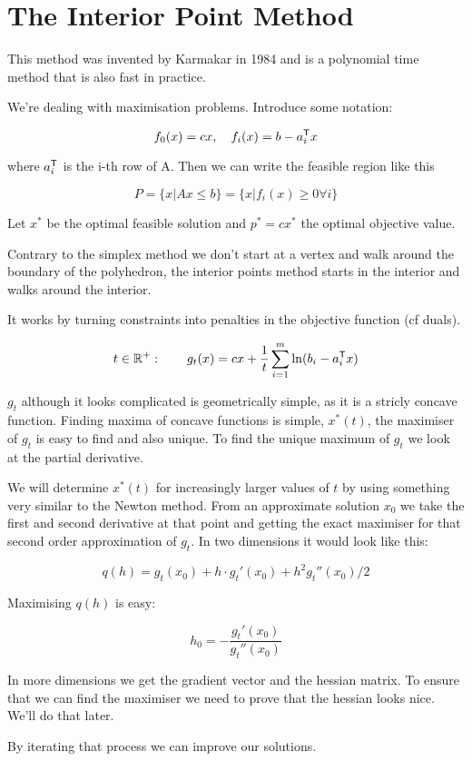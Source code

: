 \section{The Interior Point Method}

This method was invented by Karmakar in 1984 and is a polynomial time method that is also fast in practice.

We're dealing with maximisation problems. Introduce some notation:

\[f_0(x) = cx,\quad f_i(x)=b-{a}^\text{\upshape \sffamily T}_i x\]

where ${a}^\text{\upshape \sffamily T}_i$ is the i-th row of A. Then we can write the feasible region like this

\[P=\{x|Ax\leq b\}=\{x|f_i(x)\geq 0 \forall i\}\]

Let $x^*$ be the optimal feasible solution and $p^*=cx^*$ the optimal objective value. 

Contrary to the simplex method we don't start at a vertex and walk around the boundary of the polyhedron, the interior points method starts in the interior and walks around the interior.

It works by turning constraints into penalties in the objective function (cf duals). 

\[t\in \mathbb{R}^+:\qquad g_t(x)=cx+\frac 1t \sum_{i=1}^m\ln (b_i-{a}^\text{\upshape \sffamily T}_i x)\]

$g_t$ although it looks complicated is geometrically simple, as it is a stricly concave function. Finding maxima of concave functions is simple, $x^*(t)$, the maximiser of $g_t$ is easy to find and also unique. To find the unique maximum of $g_t$ we look at the partial derivative.

We will determine $x^*(t)$ for increasingly larger values of $t$ by using something very similar to the Newton method. From an approximate solution $x_0$ we take the first and second derivative at that point and getting the exact maximiser for that second order approximation of $g_t$. In two dimensions it would look like this:

\[q(h) = g_t(x_0) + h \cdot g_t'(x_0) + h^2 g_t''(x_0)/2\]

Maximising $q(h)$ is easy:

\[h_0 = - \frac{g_t'(x_0)}{g_t''(x_0)} \]

In more dimensions we get the gradient vector and the hessian matrix. To ensure that we can find the maximiser we need to prove that the hessian looks nice. We'll do that later.

By iterating that process we can improve our solutions.

